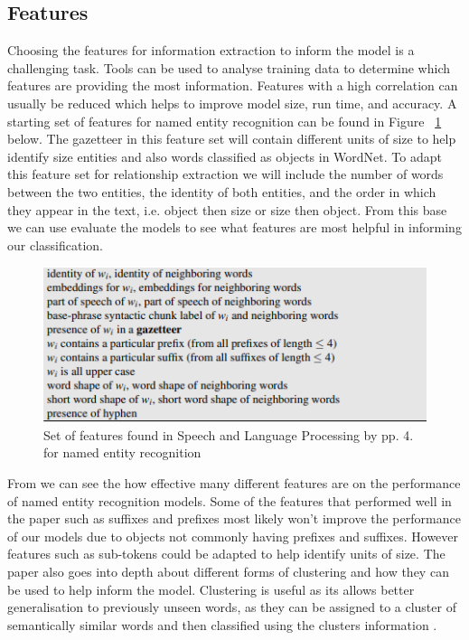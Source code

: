 \documentclass[11pt,oneside]{book}
\begin{document}
\subsection{Features}
Choosing the features for information extraction to inform the model is a challenging task. Tools can be used to analyse training data to determine which features are providing the most information. Features with a high correlation can usually be reduced which helps to improve model size, run time, and accuracy. A starting set of features for named entity recognition can be found in Figure ~\ref{fig:feature_set} below. The gazetteer in this feature set will contain different units of size to help identify size entities and also words classified as objects in WordNet. To adapt this feature set for relationship extraction we will include the number of words between the two entities, the identity of both entities, and the order in which they appear in the text, i.e. object then size or size then object. From this base we can use evaluate the models to see what features are most helpful in informing our classification.

\begin{figure}[!htbp]
\centering
\includegraphics[scale=1]{figures/features.png}
\caption{Set of features found in Speech and Language Processing by \cite{reference1} pp. 4. for named entity recognition}
\label{fig:feature_set}
\end{figure}

From \citet{many_features} we can see the how effective many different features are on the performance of named entity recognition models. Some of the features that performed well in the paper such as suffixes and prefixes most likely won't improve the performance of our models due to objects not commonly having prefixes and suffixes. However features such as sub-tokens could be adapted to help identify units of size. The paper also goes into depth about different forms of clustering and how they can be used to help inform the model. Clustering is useful as its allows better generalisation to previously unseen words, as they can be assigned to a cluster of semantically similar words and then classified using the clusters information \citep{phrasecluster}.
\end{document}
